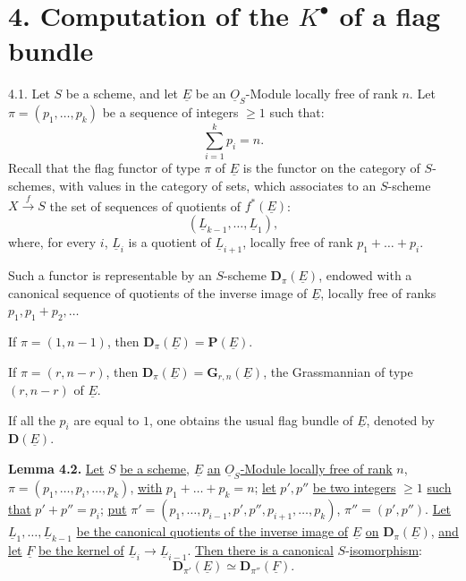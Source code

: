 %
\section*{4. Computation of the \(K^{\bullet}\) of a flag bundle}

4.1.
Let \(S\) be a scheme, and let \(\underline{E}\) be an \(\underline{O}_S\)-Module locally free of rank \(n\). Let \(\pi=(p_1,\ldots,p_k)\) be a sequence of integers \(\geq1\) such that:
\[
  \sum_{i=1}^k p_i=n.
\]
Recall that the flag functor of type \(\pi\) of \(\underline{E}\) is the functor on the category of \(S\)-schemes, with values in the category of sets, which associates to an \(S\)-scheme \(X\xrightarrow{f} S\) the set of sequences of quotients of \(f^*(\underline{E})\):
\[
  (\underline{L}_{k-1},\ldots,\underline{L}_1),
\]
where, for every \(i\), \(\underline{L}_i\) is a quotient of \(\underline{L}_{i+1}\), locally free of rank \(p_1+\ldots+p_i\).

Such a functor is representable by an \(S\)-scheme \(\mathbf D_\pi(\underline{E})\), endowed with a canonical sequence of quotients of the inverse image of \(\underline{E}\), locally free of ranks \(p_1,p_1+p_2,\ldots\)

If \(\pi=(1,n-1)\), then \(\mathbf D_\pi(\underline{E})=\mathbf P(\underline{E})\).

If \(\pi=(r,n-r)\), then \(\mathbf D_\pi(\underline{E})=\mathbf G_{r,n}(\underline{E})\), the Grassmannian of type \((r,n-r)\) of \(\underline{E}\).

If all the \(p_i\) are equal to \(1\), one obtains the usual flag bundle of \(\underline{E}\), denoted by \(\mathbf D(\underline{E})\).

\textbf{Lemma 4.2.} \uline{Let} \(S\) \uline{be a scheme}, \(\underline{E}\) \uline{an} \(\underline{O}_S\)\uline{-Module locally free of rank} \(n\), \(\pi=(p_1,\ldots,p_i,\ldots,p_k)\), \uline{with} \(p_1+\ldots+p_k=n\); \uline{let} \(p',p''\) \uline{be two integers} \(\geq1\) \uline{such that} \(p'+p''=p_i\); \uline{put} \(\pi'=(p_1,\ldots,p_{i-1},p',p'',p_{i+1},\ldots,p_k)\), \(\pi''=(p',p'')\). \uline{Let} \(\underline{L}_1,\ldots,\underline{L}_{k-1}\) \uline{be the canonical quotients of the inverse image of} \(\underline{E}\) \uline{on} \(\mathbf D_\pi(\underline{E})\), \uline{and let} \(\underline{F}\) \uline{be the kernel of} \(\underline{L}_i\to \underline{L}_{i-1}\). \uline{Then there is a canonical} \(S\)-\uline{isomorphism}:
%
\[
  \mathbf D_{\pi'}(\underline{E})\simeq \mathbf D_{\pi''}(\underline{F}).
\]

